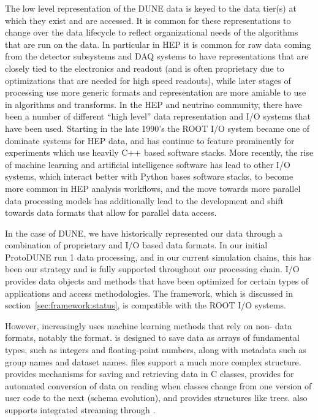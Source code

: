 \documentclass[../main-v1.tex]{subfiles}
\begin{document}
The low level representation of the DUNE data is keyed to the data tier(s) at which they exist and are accessed.  It is common for these representations to change over the data lifecycle to reflect organizational needs of the algorithms that are run on the data.  In particular in HEP it is common for raw data coming from the detector subsystems and DAQ systems to have representations that are closely tied to the electronics and readout (and is often proprietary due to optimizations that are needed for high speed readouts), while later stages of processing use more generic formats and representation are more amiable to use in algorithms and transforms.  In the HEP and neutrino community, there have been a number of different ``high level'' data representation and I/O systems that have been used.  Starting in the late 1990's the ROOT I/O system became one of dominate systems for HEP data, and has continue to feature prominently for experiments which use heavily C++ based software stacks.  More recently, the rise of machine learning and artificial intelligence software has lead to other I/O systems, which interact better with Python bases software stacks, to become more common in HEP analysis workflows, and the move towards more parallel data processing models has additionally lead to the development and shift towards data formats that allow for parallel data access.

In the case of DUNE, we have historically represented our data through a combination of proprietary and  I/O based data formats.  In our initial ProtoDUNE run 1 data processing, and in our current simulation chains, this has been our strategy and is fully supported throughout our processing chain.   I/O provides data objects and methods that have been optimized for certain types of  applications and access methodologies.  The  framework, which is discussed in section~\ref{sec:framework:status}, is compatible with the ROOT I/O systems.

However,  increasingly uses   machine learning methods that rely on non- data formats, notably the  format.   is designed to save data as arrays of fundamental types, such as integers and floating-point numbers, along with metadata such as group names and dataset names.   files support a much more complex structure.   provides mechanisms for saving and retrieving data in C\raisebox{1pt}{++} classes, provides for automated conversion of data on reading when classes change from one version of user code to the next (schema evolution), and provides structures like trees.  also supports integrated streaming through . 
\end{document}
